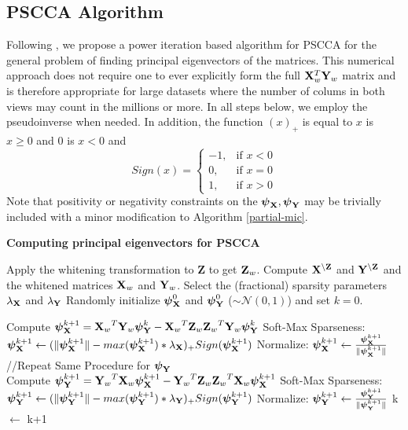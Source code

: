 \documentclass{llncs}
\newcommand{\X}{{\bf X}}
\newcommand{\Y}{{\bf Y}}
\newcommand{\Z}{{\bf Z}}
\newcommand{\bs}{\boldsymbol}
\begin{document}
\subsection{PSCCA Algorithm}
Following \cite{golub}, we propose a power iteration based algorithm
for PSCCA for the general problem of finding principal eigenvectors of
the matrices.  This numerical approach does not require one to ever
explicitly form the full $\X_{w}^T \Y_{w}$ matrix and is therefore
appropriate for large datasets where the number of colums in both views may
count in the millions or more.  In all steps below, we employ the
pseudoinverse when needed.  In addition, the function $(x)_+$ is equal to $x$ is $x \geq 0$ and $0$ is $x <0$ and 
 \begin{equation}
Sign(x)= \begin{cases} -1, & \mbox{if } x<0 \\0, & \mbox{if } x=0 \\1, & \mbox{if } x>0 \end{cases}
\end{equation}
Note that positivity or negativity constraints on the
$\bs\psi_{\X}, \bs\psi_{\Y}$ may be trivially included with a minor
modification to Algorithm \ref{partial-mic}.
\begin{algorithm}[htdp]
\small \caption{\bf Computing principal eigenvectors for PSCCA}
\label{partial-mic}
\begin{algorithmic}[1]
\STATE Apply the whitening transformation to {\Z} to get $\Z_{w}$.
\STATE Compute $\X^{\backslash \Z}$ and $\Y^{\backslash \Z}$ and the whitened matrices $\X_{w}$ and $\Y_{w}$. 
\STATE Select the (fractional) sparsity parameters $\lambda_{\X}$ and $\lambda_{\Y}$
\STATE Randomly initialize $\bs \psi_{\X}^0$ and $\bs \psi_{\Y}^0$ ($\sim \mathcal{N}(0,1)$) and set $k=0$.

\WHILE {$\Delta$ Corr($\bs X_w \bs \psi_{\X}^{k+1}$, $\bs Y_w \bs \psi_{\Y}^{k+1}$) $<$ $\epsilon$}
\STATE Compute  $\bs \psi_{\X}^{k+1}= {\X_w}^T {\Y_w} \bs \psi_{\Y}^{k} -  {\X_w}^T  {\Z_w} {\Z_w}^T {\Y_w} \bs \psi_{\Y}^{k}$
\STATE Soft-Max Sparseness:  $\bs \psi_{\X}^{k+1} \leftarrow (\|\bs \psi_{\X}^{k+1}\|  - max(\bs \psi_{\X}^{k+1})*\lambda_{\X})_+ Sign(\bs \psi_{\X}^{k+1})$
\STATE Normalize: $\bs \psi_{\X}^{k+1} \leftarrow \frac{\bs \psi_{\X}^{k+1}}{\|\bs \psi_{\X}^{k+1}\|}$\\
//Repeat Same Procedure for $\bs \psi_{\Y}$ \\
\STATE Compute  $\bs \psi_{\Y}^{k+1}= {\Y_w}^T {\X_w} \bs \psi_{\X}^{k+1} -  {\Y_w}^T  {\Z_w} {\Z_w}^T {\X_w} \bs \psi_{\X}^{k+1}$
\STATE Soft-Max Sparseness: $\bs \psi_{\Y}^{k+1} \leftarrow (\|\bs \psi_{\Y}^{k+1}\|  - max(\bs \psi_{\Y}^{k+1})*\lambda_{\Y})_+ Sign(\bs \psi_{\Y}^{k+1})$
\STATE Normalize: $\bs \psi_{\Y}^{k+1} \leftarrow \frac{\bs \psi_{\Y}^{k+1}}{\|\bs \psi_{\Y}^{k+1}\|}$
\STATE k $\leftarrow$ k+1
\ENDWHILE
\end{algorithmic}
\end{algorithm}
\end{document}

